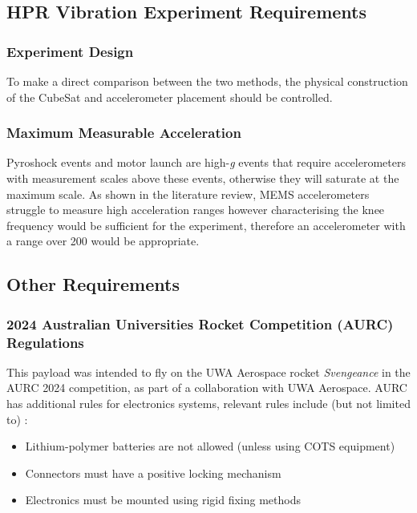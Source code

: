 \documentclass{report}
\begin{document}
\subsection{HPR Vibration Experiment Requirements}

\subsubsection{Experiment Design}

To make a direct comparison between the two methods, the physical construction of the CubeSat and accelerometer placement should be controlled.

\subsubsection{Maximum Measurable Acceleration}

Pyroshock events and motor launch are high-\textit{g} events that require accelerometers with measurement scales above these events, otherwise they will saturate at the maximum scale.
As shown in the literature review, MEMS accelerometers struggle to measure high acceleration ranges however characterising the knee frequency would be sufficient for the experiment, therefore an accelerometer with a range over \SI{200}{\gacc} would be appropriate.

\subsection{Other Requirements}

\subsubsection{2024 Australian Universities Rocket Competition (AURC) Regulations}
This payload was intended to fly on the UWA Aerospace rocket \textit{Svengeance} in the AURC 2024 competition, as part of a collaboration with UWA Aerospace. AURC has additional rules for electronics systems, relevant rules include (but not limited to) \cite{ayaa2023specifications}:
\begin{itemize}
  \item Lithium-polymer batteries are not allowed (unless using COTS equipment)
  \item Connectors must have a positive locking mechanism
  \item Electronics must be mounted using rigid fixing methods
\end{itemize}
\end{document}
